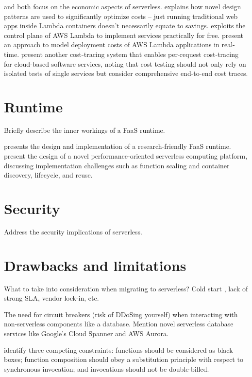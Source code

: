\documentclass[utf8,english]{gradu3}
\begin{document}
\textcite{eivy2017wary} and \textcite{villamizar2016infrastructure} both focus on the economic aspects of serverless. \textcite{adzic2017serverless} explains how novel design patterns are used to significantly optimize costs -- just running traditional web apps inside Lambda containers doesn't necessarily equate to savings. \textcite{spillner17exploiting} exploits the control plane of AWS Lambda to implement services practically for free. \textcite{leitner16modelcost} present an approach to model deployment costs of AWS Lambda applications in real-time. \textcite{kuhlenkamp17costradamus} present another cost-tracing system that enables per-request cost-tracing for cloud-based software services, noting that cost testing should not only rely on isolated tests of single services but consider comprehensive end-to-end cost traces.

\section{Runtime}

Briefly describe the inner workings of a FaaS runtime.

\textcite{spillner17snafu} presents the design and implementation of a research-friendly FaaS runtime. \textcite{mcgrath17implement} present the design of a novel performance-oriented serverless computing platform, discussing implementation challenges such as function scaling and container discovery, lifecycle, and reuse.

\section{Security}

Address the security implications of serverless.

\section{Drawbacks and limitations}

What to take into consideration when migrating to serverless? Cold start \parencite{lloydserverless}, lack of strong SLA, vendor lock-in, etc.

The need for circuit breakers (risk of DDoSing yourself) when interacting with non-serverless components like a database. Mention novel serverless database services like Google's Cloud Spanner and AWS Aurora.

\textcite{baldini17trilemma} identify three competing constraints: functions should be considered as black boxes; function composition should obey a substitution principle with respect to synchronous invocation; and invocations should not be double-billed.
\end{document}

